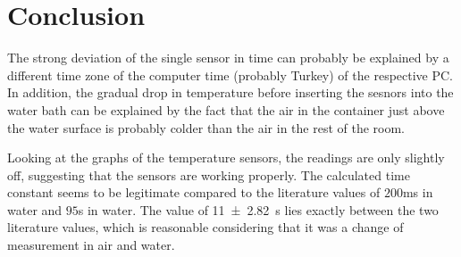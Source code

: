 \section{Conclusion}
\label{sec:conclusion}
The strong deviation of the single sensor in time can probably be explained by a different time zone of the computer time (probably Turkey) of the respective PC.
In addition, the gradual drop in temperature before inserting the sesnors into the water bath can be explained by the fact that the air in the container just above the water surface is probably colder than the air in the rest of the room.

Looking at the graphs of the temperature sensors, the readings are only slightly off, suggesting that the sensors are working properly.
The calculated time constant seems to be legitimate compared to the literature values of $200$\;ms in water and $95$\;s in water.
The value of \SI{11(2.82)}{\second} lies exactly between the two literature values, which is reasonable considering that it was a change of measurement in air and water.